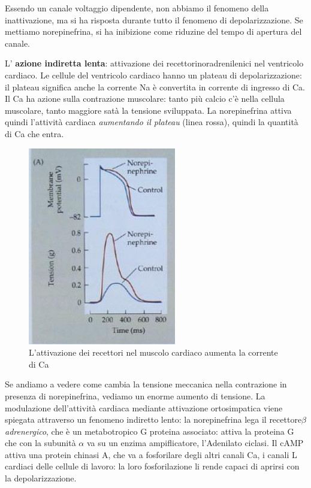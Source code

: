 \documentclass[a4paper,12pt]{article}
\begin{document}
Essendo un canale voltaggio dipendente, non abbiamo il fenomeno della inattivazione, ma si ha risposta durante tutto il fenomeno di depolarizzazione. Se mettiamo norepinefrina, si ha inibizione come riduzine del tempo di apertura del canale.

L' \textbf{azione indiretta lenta}: attivazione dei recettorinoradrenilenici nel ventricolo cardiaco. Le cellule del ventricolo cardiaco hanno un plateau di depolarizzazione: il plateau significa anche la corrente Na è convertita in corrente di ingresso di Ca. Il Ca ha azione sulla contrazione muscolare: tanto più calcio c'è nella cellula muscolare, tanto maggiore satà la tensione sviluppata. La norepinefrina attiva quindi l'attività cardiaca \emph{aumentando il plateau} (linea rossa), quindi la quantità di Ca che entra.

\begin{figure}[H]
\centering
\includegraphics[scale=0.5]{immagine/plateau.jpg}
\caption{L'attivazione dei recettori nel muscolo cardiaco aumenta la corrente di Ca}
\end{figure} 

Se andiamo a vedere come cambia la tensione meccanica nella contrazione in presenza di norepinefrina, vediamo un enorme aumento di tensione. La modulazione dell'attività cardiaca mediante attivazione ortosimpatica viene spiegata attraverso un fenomeno indiretto lento: la norepinefrina lega il recettore\emph{$\beta$ adrenergico}, che è un metabotropico G proteina associato: attiva la proteina G che con la subunità $\alpha$ va su un enzima ampiflicatore, l'Adenilato ciclasi. Il cAMP attiva una protein chinasi A, che va a fosforilare degli altri canali Ca, i canali L cardiaci delle cellule di lavoro: la loro fosforilazione li rende capaci di aprirsi con la depolarizzazione. 
\end{document}
